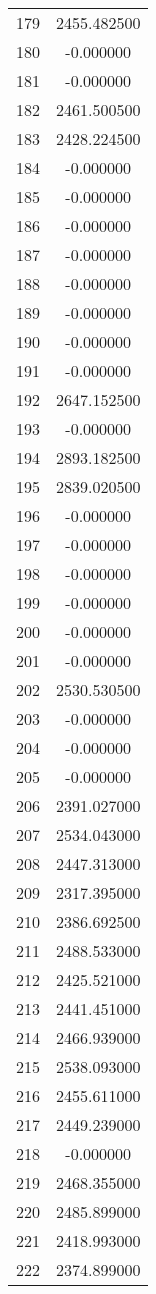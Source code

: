 \documentclass[12pt]{article}
\begin{document}
\begin{longtable}{@{}cc@{}}
179 & 2455.482500 \\
180 & -0.000000 \\
181 & -0.000000 \\
182 & 2461.500500 \\
183 & 2428.224500 \\
184 & -0.000000 \\
185 & -0.000000 \\
186 & -0.000000 \\
187 & -0.000000 \\
188 & -0.000000 \\
189 & -0.000000 \\
190 & -0.000000 \\
191 & -0.000000 \\
192 & 2647.152500 \\
193 & -0.000000 \\
194 & 2893.182500 \\
195 & 2839.020500 \\
196 & -0.000000 \\
197 & -0.000000 \\
198 & -0.000000 \\
199 & -0.000000 \\
200 & -0.000000 \\
201 & -0.000000 \\
202 & 2530.530500 \\
203 & -0.000000 \\
204 & -0.000000 \\
205 & -0.000000 \\
206 & 2391.027000 \\
207 & 2534.043000 \\
208 & 2447.313000 \\
209 & 2317.395000 \\
210 & 2386.692500 \\
211 & 2488.533000 \\
212 & 2425.521000 \\
213 & 2441.451000 \\
214 & 2466.939000 \\
215 & 2538.093000 \\
216 & 2455.611000 \\
217 & 2449.239000 \\
218 & -0.000000 \\
219 & 2468.355000 \\
220 & 2485.899000 \\
221 & 2418.993000 \\
222 & 2374.899000 \\

\end{longtable}
\end{document}
